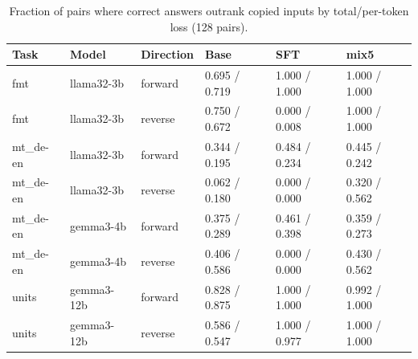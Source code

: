 \begin{table}[t]
\centering\small
\begin{tabular}{llllll}
\toprule
Task & Model & Direction & Base & SFT & mix5 \\
\midrule
fmt & llama32-3b & forward & 0.695 / 0.719 & 1.000 / 1.000 & 1.000 / 1.000 \\
fmt & llama32-3b & reverse & 0.750 / 0.672 & 0.000 / 0.008 & 1.000 / 1.000 \\
mt\_de-en & llama32-3b & forward & 0.344 / 0.195 & 0.484 / 0.234 & 0.445 / 0.242 \\
mt\_de-en & llama32-3b & reverse & 0.062 / 0.180 & 0.000 / 0.000 & 0.320 / 0.562 \\
mt\_de-en & gemma3-4b & forward & 0.375 / 0.289 & 0.461 / 0.398 & 0.359 / 0.273 \\
mt\_de-en & gemma3-4b & reverse & 0.406 / 0.586 & 0.000 / 0.000 & 0.430 / 0.562 \\
units & gemma3-12b & forward & 0.828 / 0.875 & 1.000 / 1.000 & 0.992 / 1.000 \\
units & gemma3-12b & reverse & 0.586 / 0.547 & 1.000 / 0.977 & 1.000 / 1.000 \\
\bottomrule
\end{tabular}
\caption{Fraction of pairs where correct answers outrank copied inputs by total/per-token loss (128 pairs).}
\label{tab:sprint-candidates}
\end{table}
